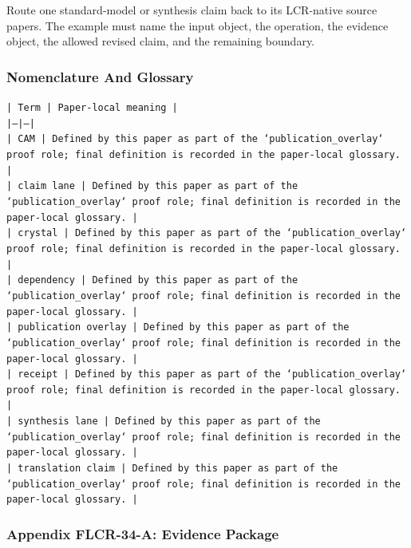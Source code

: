 \documentclass[11pt]{article}
\begin{document}
Route one standard-model or synthesis claim back to its LCR-native source papers. The example must name the input object, the operation,
the evidence object, the allowed revised claim, and the remaining boundary.

\subsubsection*{Nomenclature And Glossary}

\noindent\texttt{| Term | Paper-local meaning |}\\
\noindent\texttt{|---|---|}\\
\noindent\texttt{| CAM | Defined by this paper as part of the `publication\_overlay` proof role; final definition is recorded in the paper-local glossary. |}\\
\noindent\texttt{| claim lane | Defined by this paper as part of the `publication\_overlay` proof role; final definition is recorded in the paper-local glossary. |}\\
\noindent\texttt{| crystal | Defined by this paper as part of the `publication\_overlay` proof role; final definition is recorded in the paper-local glossary. |}\\
\noindent\texttt{| dependency | Defined by this paper as part of the `publication\_overlay` proof role; final definition is recorded in the paper-local glossary. |}\\
\noindent\texttt{| publication overlay | Defined by this paper as part of the `publication\_overlay` proof role; final definition is recorded in the paper-local glossary. |}\\
\noindent\texttt{| receipt | Defined by this paper as part of the `publication\_overlay` proof role; final definition is recorded in the paper-local glossary. |}\\
\noindent\texttt{| synthesis lane | Defined by this paper as part of the `publication\_overlay` proof role; final definition is recorded in the paper-local glossary. |}\\
\noindent\texttt{| translation claim | Defined by this paper as part of the `publication\_overlay` proof role; final definition is recorded in the paper-local glossary. |}\\

\subsubsection*{Appendix FLCR-34-A: Evidence Package}
\end{document}
